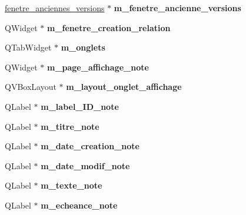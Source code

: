 \begin{DoxyCompactItemize}
\hyperlink{classfenetre__anciennes__versions}{fenetre\+\_\+anciennes\+\_\+versions} $\ast$ {\bfseries m\+\_\+fenetre\+\_\+ancienne\+\_\+versions}
\item 
\mbox{\label{class_fen_principale_a5a5ba2e300f3a1da0edbee4fbe629a17}} 
Q\+Widget $\ast$ {\bfseries m\+\_\+fenetre\+\_\+creation\+\_\+relation}
\item 
\mbox{\label{class_fen_principale_a83873dd0fdfb76d95634428393947714}} 
Q\+Tab\+Widget $\ast$ {\bfseries m\+\_\+onglets}
\item 
\mbox{\label{class_fen_principale_af48c354467b7971f1da2390d9a656c30}} 
Q\+Widget $\ast$ {\bfseries m\+\_\+page\+\_\+affichage\+\_\+note}
\item 
\mbox{\label{class_fen_principale_a0ce92e619698defb17299db7fac701c5}} 
Q\+V\+Box\+Layout $\ast$ {\bfseries m\+\_\+layout\+\_\+onglet\+\_\+affichage}
\item 
\mbox{\label{class_fen_principale_ad65396826d0d244b45ee0bc34bffb0f2}} 
Q\+Label $\ast$ {\bfseries m\+\_\+label\+\_\+\+I\+D\+\_\+note}
\item 
\mbox{\label{class_fen_principale_ae3630c82820553ce8aaef41bfd712574}} 
Q\+Label $\ast$ {\bfseries m\+\_\+titre\+\_\+note}
\item 
\mbox{\label{class_fen_principale_a77b7415d13faa68556a0ebfa8a8272ec}} 
Q\+Label $\ast$ {\bfseries m\+\_\+date\+\_\+creation\+\_\+note}
\item 
\mbox{\label{class_fen_principale_a4ffed17afb6c84be69fedd43517e03b6}} 
Q\+Label $\ast$ {\bfseries m\+\_\+date\+\_\+modif\+\_\+note}
\item 
\mbox{\label{class_fen_principale_a4b1b4b77ab2700755732450eb6a45a4d}} 
Q\+Label $\ast$ {\bfseries m\+\_\+texte\+\_\+note}
\item 
\mbox{\label{class_fen_principale_a6f49a22a4798a52a08b4837d218dcf18}} 
Q\+Label $\ast$ {\bfseries m\+\_\+echeance\+\_\+note}

\end{DoxyCompactItemize}

